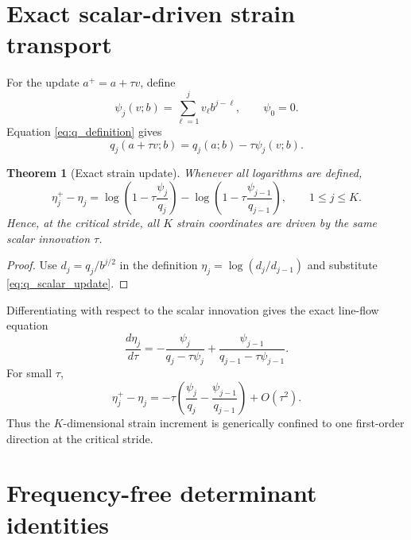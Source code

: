 \documentclass[11pt]{amsart}
\numberwithin{equation}{section}
\theoremstyle{plain}
\newtheorem{theorem}{Theorem}[section]
\theoremstyle{definition}
\theoremstyle{remark}
\begin{document}
\section{Exact scalar-driven strain transport}
\label{sec:scalar_strain_transport}

For the update $a^+=a+\tau v$, define
\begin{equation}
\psi_j(v;b)
=
\sum_{\ell=1}^{j}v_\ell b^{j-\ell},
\qquad
\psi_0=0.
\label{eq:psi_definition}
\end{equation}
Equation \eqref{eq:q_definition} gives
\begin{equation}
q_j(a+\tau v;b)=q_j(a;b)-\tau\psi_j(v;b).
\label{eq:q_scalar_update}
\end{equation}

\begin{theorem}[Exact strain update]
\label{thm:exact_strain_update}
Whenever all logarithms are defined,
\begin{equation}
\boxed{
\eta_j^+-\eta_j
=
\log\left(1-\tau\frac{\psi_j}{q_j}\right)
-
\log\left(1-\tau\frac{\psi_{j-1}}{q_{j-1}}\right),
\qquad 1\leq j\leq K.
}
\label{eq:exact_eta_scalar_update}
\end{equation}
Hence, at the critical stride, all $K$ strain coordinates are driven by the same scalar innovation $\tau$.
\end{theorem}

\begin{proof}
Use $d_j=q_j/b^{j/2}$ in the definition $\eta_j=\log(d_j/d_{j-1})$ and substitute \eqref{eq:q_scalar_update}.
\end{proof}

Differentiating with respect to the scalar innovation gives the exact line-flow equation
\begin{equation}
\frac{d\eta_j}{d\tau}
=
-\frac{\psi_j}{q_j-\tau\psi_j}
+
\frac{\psi_{j-1}}{q_{j-1}-\tau\psi_{j-1}}.
\label{eq:eta_tau_flow}
\end{equation}
For small $\tau$,
\begin{equation}
\eta_j^+-\eta_j
=
-\tau
\left(
\frac{\psi_j}{q_j}
-
\frac{\psi_{j-1}}{q_{j-1}}
\right)
+O(\tau^2).
\label{eq:eta_small_tau}
\end{equation}
Thus the $K$-dimensional strain increment is generically confined to one first-order direction at the critical stride.

\section{Frequency-free determinant identities}
\label{sec:frequency_free_determinants}
\end{document}
